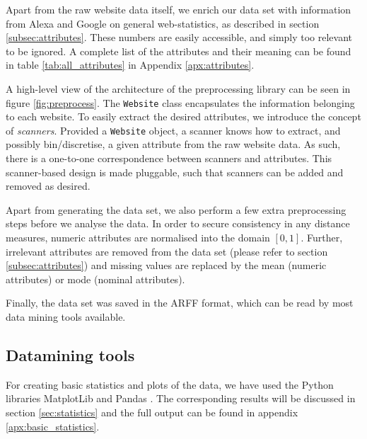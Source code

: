 Apart from the raw website data itself, we enrich our data set with information from Alexa and Google on general web-statistics, as described in section \ref{subsec:attributes}. These numbers are easily accessible, and simply too relevant to be ignored. A complete list of the attributes and their meaning can be found in table \ref{tab:all_attributes} in Appendix \ref{apx:attributes}.

A high-level view of the architecture of the preprocessing library can be seen in figure \ref{fig:preprocess}. The \texttt{Website} class encapsulates the information belonging to each website. To easily extract the desired attributes, we introduce the concept of \textit{scanners}. Provided  a \texttt{Website} object, a scanner knows how to extract, and possibly bin/discretise, a given attribute from the raw website data. As such, there is a one-to-one correspondence between scanners and attributes. This scanner-based design is made pluggable, such that scanners can be added and removed as desired.


Apart from generating the data set, we also perform a few extra preprocessing steps before we analyse the data. In order to secure consistency in any distance measures, numeric attributes are normalised into the domain $[0, 1]$. Further, irrelevant attributes are removed from the data set (please refer to section \ref{subsec:attributes}) and missing values are replaced by the mean (numeric attributes) or mode (nominal attributes).

Finally, the data set was saved in the ARFF format, which can be read by most data mining tools available.

\subsection{Datamining tools}
\label{subsec:weka}

For creating basic statistics and plots of the data, we have used the {Python} libraries {MatplotLib} and {Pandas} \cite{matplotlib, pandas}. The corresponding results will be discussed in section \ref{sec:statistics} and the full output can be found in appendix \ref{apx:basic_statistics}.

